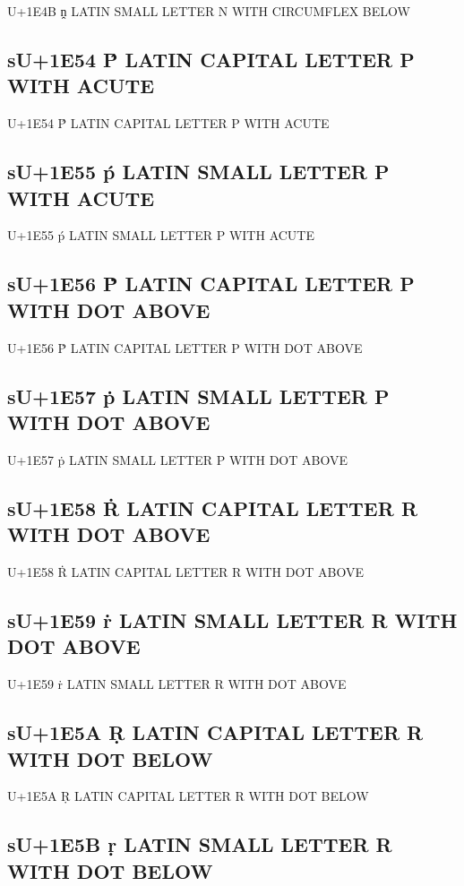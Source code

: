 U+1E4B ṋ LATIN SMALL LETTER N WITH CIRCUMFLEX BELOW

\subsection{sU+1E54 Ṕ LATIN CAPITAL LETTER P WITH ACUTE}

U+1E54 Ṕ LATIN CAPITAL LETTER P WITH ACUTE

\subsection{sU+1E55 ṕ LATIN SMALL LETTER P WITH ACUTE}

U+1E55 ṕ LATIN SMALL LETTER P WITH ACUTE

\subsection{sU+1E56 Ṗ LATIN CAPITAL LETTER P WITH DOT ABOVE}

U+1E56 Ṗ LATIN CAPITAL LETTER P WITH DOT ABOVE

\subsection{sU+1E57 ṗ LATIN SMALL LETTER P WITH DOT ABOVE}

U+1E57 ṗ LATIN SMALL LETTER P WITH DOT ABOVE

\subsection{sU+1E58 Ṙ LATIN CAPITAL LETTER R WITH DOT ABOVE}

U+1E58 Ṙ LATIN CAPITAL LETTER R WITH DOT ABOVE

\subsection{sU+1E59 ṙ LATIN SMALL LETTER R WITH DOT ABOVE}

U+1E59 ṙ LATIN SMALL LETTER R WITH DOT ABOVE

\subsection{sU+1E5A Ṛ LATIN CAPITAL LETTER R WITH DOT BELOW}

U+1E5A Ṛ LATIN CAPITAL LETTER R WITH DOT BELOW

\subsection{sU+1E5B ṛ LATIN SMALL LETTER R WITH DOT BELOW}

